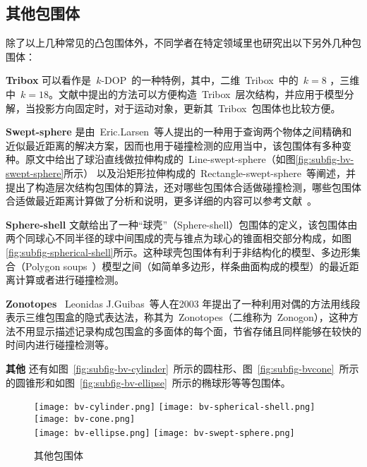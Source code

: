 \subsection{其他包围体}

除了以上几种常见的凸包围体外，不同学者在特定领域里也研究出以下另外几种包围体：\\
\begin{inparaenum}[(1)]
\indent
\item \textbf{Tribox} 可以看作是~$k$-DOP~的一种特例，其中，二维~Tribox~中的~$k=8$ ，三维中~$k=18$。文献中提出的方法可以方便构造~Tribox~层次结构，并应用于模型分解，当投影方向固定时，对于运动对象，更新其~Tribox~包围体也比较方便。 \\ 
\indent
\item \textbf{Swept-sphere}
是由~Eric.Larsen~等人\cite{Larsen1999Fast}提出的一种用于查询两个物体之间精确和近似最近距离的解决方案，因而也用于碰撞检测的应用当中，该包围体有多种变种。原文中给出了球沿直线做拉伸构成的~Line-swept-sphere（如图\ref{fig:subfig-bv-swept-sphere}所示）
以及沿矩形拉伸构成的~Rectangle-swept-sphere~等阐述，并提出了构造层次结构包围体的算法，还对哪些包围体合适做碰撞检测，哪些包围体合适做最近距离计算做了分析和说明，更多详细的内容可以参考文献~。\\
\indent
\item \textbf{Sphere-shell}
文献给出了一种“球壳”（Sphere-shell）包围体的定义，该包围体由两个同球心不同半径的球中间围成的壳与锥点为球心的锥面相交部分构成，如图\ref{fig:subfig-spherical-shell}所示。这种球壳包围体有利于非结构化的模型、多边形集合（Polygon
soups~）模型之间（如简单多边形，样条曲面构成的模型）的最近距离计算或者进行碰撞检测。\\
\indent
\item \textbf{Zonotopes} ~Leonidas
J.Guibas~\cite{Guibas2003Zonotopes}等人在2003 年提出了一种利用对偶的方法用线段表示三维包围盒的隐式表达法，称其为~Zonotopes（二维称为~Zonogon），这种方法不用显示描述记录构成包围盒的多面体的每个面，节省存储且同样能够在较快的时间内进行碰撞检测等。\\
\indent
\item \textbf{其他}
还有如图~\ref{fig:subfig-bv-cylinder}~所示的圆柱形\cite{Schomer2000Smallest}、图~\ref{fig:subfig-bvcone}~所示的圆锥形\cite{held1997erit}和如图~\ref{fig:subfig-bv-ellipse}~所示的椭球形\cite{Wang2004Efficient}等等包围体。
\end{inparaenum}
\begin{figure}[htbp]
  \centering%
    {\texttt{[image: bv-cylinder.png]}}
    {\texttt{[image: bv-spherical-shell.png]}}
    {\texttt{[image: bv-cone.png]}}
  \\
    {\texttt{[image: bv-ellipse.png]}}
    {\texttt{[image: bv-swept-sphere.png]}}
  \caption{其他包围体}
  \label{fig:bv-others}
\end{figure}

